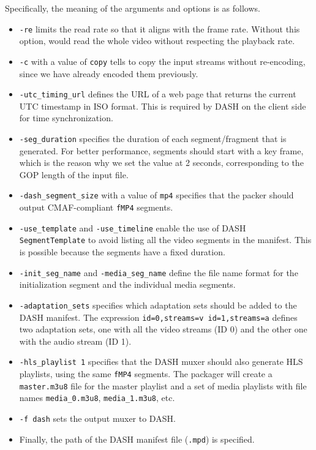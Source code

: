 Specifically, the meaning of the arguments and options is as follows.

\begin{itemize}
    \item \texttt{-re} limits the read rate so that it aligns with the frame rate. Without this option, \ffmpeg{} would read the whole video without respecting the playback rate.
    \item \texttt{-c} with a value of \texttt{copy} tells \ffmpeg{} to copy the input streams without re-encoding, since we have already encoded them previously.
    \item \texttt{-utc\_timing\_url} defines the URL of a web page that returns the current UTC timestamp in ISO format. This is required by DASH on the client side for time synchronization.
    \item \texttt{-seg\_duration} specifies the duration of each segment/fragment that is generated. For better performance, segments should start with a key frame, which is the reason why we set the value at 2 seconds, corresponding to the GOP length of the input file.
    \item \texttt{-dash\_segment\_size} with a value of \texttt{mp4} specifies that the packer should output CMAF-compliant \texttt{fMP4} segments.
    \item \texttt{-use\_template} and \texttt{-use\_timeline} enable the use of DASH \texttt{SegmentTemplate} to avoid listing all the video segments in the manifest. This is possible because the segments have a fixed duration.
    \item \texttt{-init\_seg\_name} and \texttt{-media\_seg\_name} define the file name format for the initialization segment and the individual media segments.
    \item \texttt{-adaptation\_sets} specifies which adaptation sets should be added to the DASH manifest. The expression \texttt{id=0,streams=v id=1,streams=a} defines two adaptation sets, one with all the video streams (ID 0) and the other one 
    with the audio stream (ID 1).
    \item \texttt{-hls\_playlist 1} specifies that the DASH muxer should also generate HLS playlists, using the same \texttt{fMP4} segments. The packager will create a \texttt{master.m3u8} file for the master playlist and a set of media playlists with file names \texttt{media\_0.m3u8}, \texttt{media\_1.m3u8}, etc.
    \item \texttt{-f dash} sets the \ffmpeg{} output muxer to DASH.
    \item Finally, the path of the DASH manifest file (\texttt{.mpd}) is specified.
\end{itemize}

